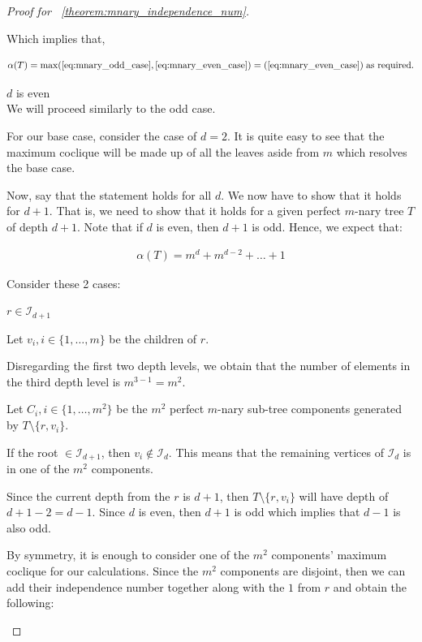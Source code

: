 \documentclass{amsart}
\theoremstyle{definition}
\begin{document}
\begin{proof}[Proof for ~\ref{theorem:mnary_independence_num}]
\begin{caseof}
		Which implies that,

		\begin{align*}
			\alpha(T) = \max(\ref{eq:mnary_odd_case}, \ref{eq:mnary_even_case}) = (\ref{eq:mnary_even_case})\; \text{as required.}
		\end{align*}

		\item $d$ is even \\

		We will proceed similarly to the odd case.

		For our base case, consider the case of $d = 2$. It is quite easy to see that the maximum coclique will be made up of all the leaves aside from $m$ which resolves the base case.

		Now, say that the statement holds for all $d$. We now have to show that it holds for $d+1$. That is, we need to show that it holds for a given perfect $m$-nary tree $T$ of depth $d + 1$. Note that if $d$ is even, then $d + 1$ is odd. Hence, we expect that:

		\begin{align*}
			\alpha(T) = m^d + m^{d - 2} + \ldots + 1
		\end{align*}

		Consider these 2 cases:

		\begin{subcaseof}
			\item $r \in \mathcal{I}_{d + 1}$

			Let $v_i, i \in \{1, \dots, m\}$ be the children of $r$.

			Disregarding the first two depth levels, we obtain that the number of elements in the third depth level is $m^{3-1} = m^2$.

			Let $C_i, i \in \{1,\dots, m^2\}$ be the $m^2$ perfect $m$-nary sub-tree components generated by $T \setminus \{r, v_i\}$.

			If the root $\in \mathcal{I}_{d + 1}$, then $v_i \not\in \mathcal{I}_d$. This means that the remaining vertices of $\mathcal{I}_d$ is in one of the $m^2$ components.

			Since the current depth from the $r$ is $d + 1$, then $T \setminus \{r, v_i\}$ will have depth of $d + 1 - 2 = d - 1$. Since $d$ is even, then $d + 1$ is odd which implies that $d - 1$ is also odd.

			By symmetry, it is enough to consider one of the $m^2$ components' maximum coclique for our calculations. Since the $m^2$ components are disjoint, then we can add their independence number together along with the $1$ from $r$ and obtain the following:


\end{subcaseof}
\end{caseof}
\end{proof}
\end{document}
